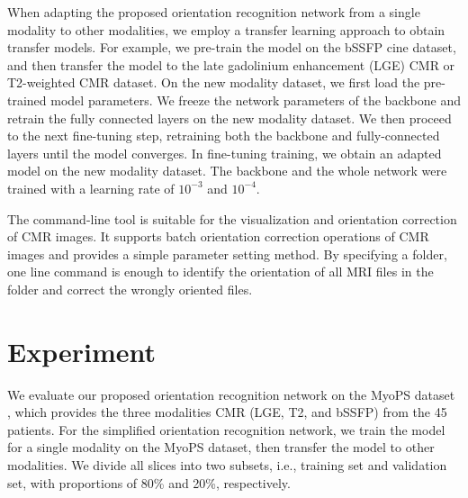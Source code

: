 \documentclass[runningheads]{llncs}
\begin{document}
When adapting the proposed orientation recognition network from a single modality to other modalities, we employ a transfer learning approach to obtain transfer models. For example, we pre-train the model on the bSSFP cine dataset, and then transfer the model to the late gadolinium enhancement (LGE) CMR or T2-weighted CMR dataset. On the new modality dataset, we first load the pre-trained model parameters. We freeze the network parameters of the backbone and retrain the fully connected layers on the new modality dataset. We then proceed to the next fine-tuning step, retraining both the backbone and fully-connected layers until the model converges. In fine-tuning training, we obtain an adapted model on the new modality dataset. The backbone and the whole network were trained with a learning rate of $10^{-3}$ and $10^{-4}$.

The command-line tool is suitable for the visualization and orientation correction of CMR images. It supports batch orientation correction operations of CMR images and provides a simple parameter setting method. By specifying a folder, one line command is enough to identify the orientation of all MRI files in the folder and correct the wrongly oriented files.

\section{Experiment}

We evaluate our proposed orientation recognition network on the MyoPS dataset \cite{PAMI,Spr2016}, which provides the three modalities CMR (LGE, T2, and bSSFP) from the 45 patients. For the simplified orientation recognition network, we train the model for a single modality on the MyoPS dataset, then transfer the model to other modalities. We divide all slices into two subsets, i.e., training set and validation set, with proportions of 80\% and 20\%, respectively.
\end{document}

